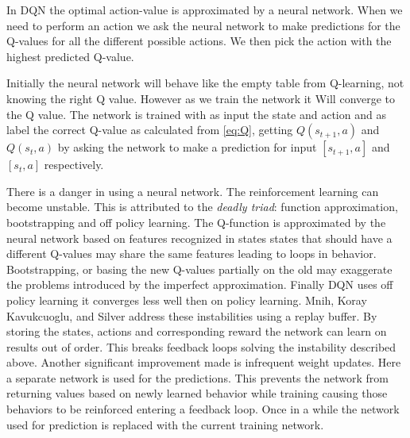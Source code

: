 In DQN the optimal action-value is approximated by a neural network. When we need to perform an action we ask the neural network to make predictions for the Q-values for all the different possible actions. We then pick the action with the highest predicted Q-value. 
 
Initially the neural network will behave like the empty table from Q-learning, not knowing the right Q value. However as we train the network it Will converge to the Q value. The network is trained with as input the state and action and as label the correct Q-value as calculated from \autoref{eq:Q}, getting $Q\left(s_{t+1}, a\right)$ and $Q\left(s_{t}, a\right)$ by asking the network to make a prediction for input $[s_{t+1}, a]$ and $[s_{t}, a]$ respectively. 

There is a danger in using a neural network. The reinforcement learning can become unstable\cite{triad}. This is attributed to the \textit{deadly triad}: function approximation, bootstrapping and off policy learning. The Q-function is approximated by the neural network based on features recognized in states states that should have a different Q-values may share the same features leading to loops in behavior. Bootstrapping, or basing the new Q-values partially on the old may exaggerate the problems introduced by the imperfect approximation. Finally DQN uses off policy learning it converges less well then on policy learning.
\label{sec:infrequent_weight_updates}
Mnih, Koray Kavukcuoglu, and Silver\cite{DQN} address these instabilities using a replay buffer. By storing the states, actions and corresponding reward the network can learn on results out of order. This breaks feedback loops solving the instability described above. Another significant improvement made is infrequent weight updates. Here a separate network is used for the predictions. This prevents the network from returning values based on newly learned behavior while training causing those behaviors to be reinforced entering a feedback loop. Once in a while the network used for prediction is replaced with the current training network.